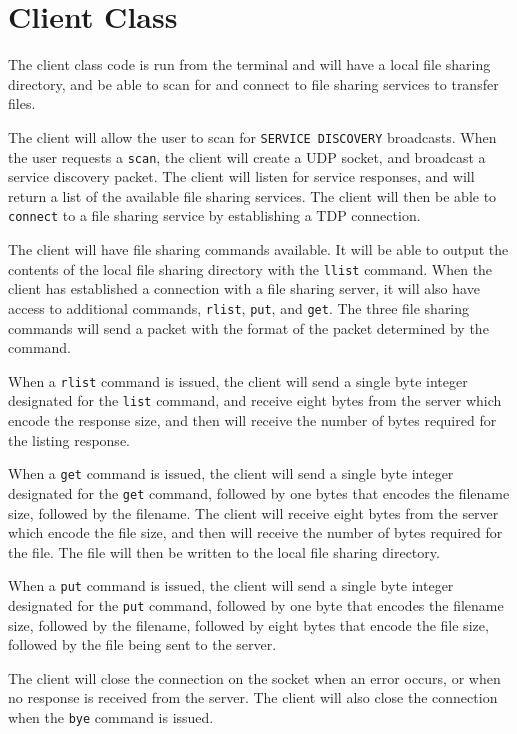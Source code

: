 \section*{Client Class}
The client class code is run from the terminal and will have a local file sharing directory, and be able to scan for and connect to file sharing services to transfer files.

The client will allow the user to scan for \texttt{SERVICE DISCOVERY} broadcasts. When the user requests a \texttt{scan}, the client will create a UDP socket, and broadcast a service discovery packet. The client will listen for service responses, and will return a list of the available file sharing services. The client will then be able to \texttt{connect} to a file sharing service by establishing a TDP connection.

The client will have file sharing commands available. It will be able to output the contents of the local file sharing directory with the \texttt{llist} command. When the client has established a connection with a file sharing server, it will also have access to additional commands, \texttt{rlist}, \texttt{put}, and \texttt{get}. The three file sharing commands will send a packet with the format of the packet determined by the command.

When a \texttt{rlist} command is issued, the client will send a single byte integer designated for the \texttt{list} command, and receive eight bytes from the server which encode the response size, and then will receive the number of bytes required for the listing response.

When a \texttt{get} command is issued, the client will send a single byte integer designated for the \texttt{get} command, followed by one bytes that encodes the filename size, followed by the filename. The client will receive eight bytes from the server which encode the file size, and then will receive the number of bytes required for the file. The file will then be written to the local file sharing directory.

When a \texttt{put} command is issued, the client will send a single byte integer designated for the \texttt{put} command, followed by one byte that encodes the filename size, followed by the filename, followed by eight bytes that encode the file size, followed by the file being sent to the server.

The client will close the connection on the socket when an error occurs, or when no response is received from the server. The client will also close the connection when the \texttt{bye} command is issued.
